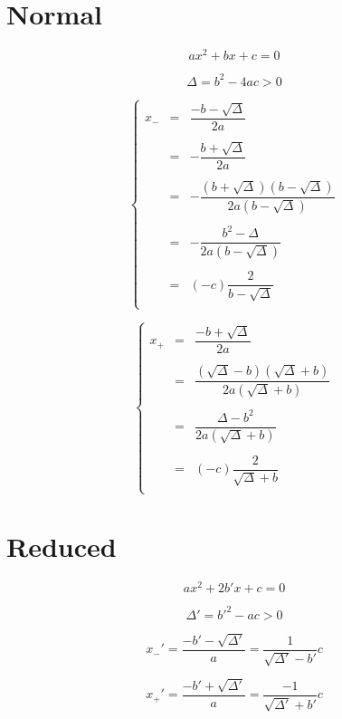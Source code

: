 \documentclass[aps,12pt]{revtex4}
\begin{document}
\section{Normal}

$$ax^2+bx+c=0$$

$$
\Delta = b^2-4ac > 0
$$	

$$
\left\lbrace
\begin{array}{rcl}
	x_- & = &  \dfrac{-b-\sqrt{\Delta}}{2a} \\
	\\
	& = & -  \dfrac{b+\sqrt{\Delta}}{2a} \\
	\\
	& = & -  \dfrac{(b+\sqrt{\Delta})(b-\sqrt{\Delta})}{2a(b-\sqrt{\Delta})}\\
	\\
	& = & - \dfrac{b^2-\Delta}{2a(b-\sqrt{\Delta})}\\
	\\
	& = & (-c) \dfrac{2}{b-\sqrt{\Delta}} \\ 
\end{array}
\right.
$$

$$
\left\lbrace
\begin{array}{rcl}
	x_+ & = &  \dfrac{-b+\sqrt{\Delta}}{2a} \\
	\\
	 & = & \dfrac{(\sqrt{\Delta}-b)(\sqrt{\Delta}+b)}{2a(\sqrt{\Delta}+b)}\\
	\\
	& = & \dfrac{\Delta-b^2}{2a(\sqrt{\Delta}+b)}\\
	\\
	& = & (-c) \dfrac{2}{\sqrt{\Delta}+b}\\
\end{array}
\right.
$$


\section{Reduced}

$$ax^2+2b'x+c=0$$

$$
\Delta' = b'^2-ac > 0
$$	

$$
	x_-' = \dfrac{-b'-\sqrt{\Delta'}}{a} = \dfrac{1}{\sqrt{\Delta'}-b'}{c}
$$

$$
	x_+' = \dfrac{-b'+\sqrt{\Delta'}}{a} = \dfrac{-1}{\sqrt{\Delta'}+b'}{c}
$$
\end{document}
